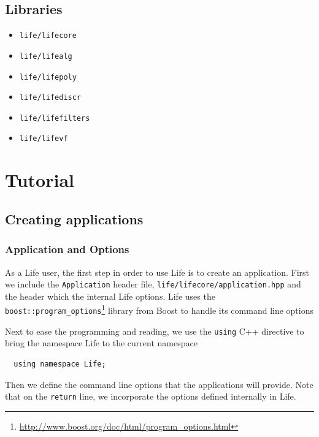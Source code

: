 \documentclass[a4paper]{book}
\newcommand{\cpp}{C{\hspace{-.3em}\vspace{-.2em}\tiny++}\xspace}
\newcommand{\life}{Life\xspace}
\begin{document}
\section{Libraries}

\begin{itemize}
\item \lstinline!life/lifecore!
\item \lstinline!life/lifealg!
\item \lstinline!life/lifepoly!
\item \lstinline!life/lifediscr!
\item \lstinline!life/lifefilters!
\item \lstinline!life/lifevf!
\end{itemize}

\chapter{Tutorial}
\label{sec:tutorial}


\section{Creating applications}
\label{sec:creat-appl}



\subsection{Application and Options}
\label{sec:options}

As a \life user, the first step in order to use \life is to create an
application. First we include the \lstinline!Application! header file,
\lstinline!life/lifecore/application.hpp! and the header which the
internal \life options. \life uses the
\lstinline!boost::program_options!\footnote{\url{http://www.boost.org/doc/html/program_options.html}}
library from Boost to handle its command line options




Next to ease the programming and reading, we use the \lstinline!using!
\cpp directive to bring the namespace Life to the current namespace

\begin{lstlisting}
  using namespace Life;
\end{lstlisting}

Then we define the command line options that the applications will
provide. Note that on the \lstinline!return! line, we incorporate the
options defined internally in \life.
\end{document}
